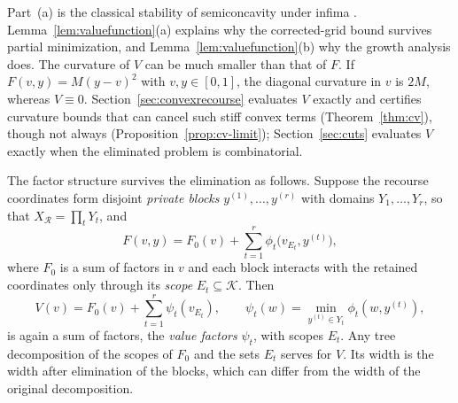 Part~(a) is the classical stability of semiconcavity under infima
\cite{CannarsaSinestrari2004}. Lemma~\ref{lem:valuefunction}(a) explains why
the corrected-grid bound survives partial minimization, and
Lemma~\ref{lem:valuefunction}(b) why the growth analysis does. The curvature
of $V$ can be much smaller than that of $F$. If $F(v,y)=M(y-v)^2$ with
$v,y\in[0,1]$, the diagonal curvature in $v$ is $2M$, whereas $V\equiv0$.
Section~\ref{sec:convexrecourse} evaluates $V$ exactly and certifies
curvature bounds that can cancel such stiff convex terms
(Theorem~\ref{thm:cv}), though not always (Proposition~\ref{prop:cv-limit});
Section~\ref{sec:cuts} evaluates $V$ exactly when the eliminated problem is
combinatorial.

The factor structure survives the elimination as follows. Suppose the
recourse coordinates form disjoint \emph{private blocks}
$y^{(1)},\dots,y^{(r)}$ with domains $Y_1,\dots,Y_r$, so that
$X_{\mathcal R}=\prod_tY_t$, and
\begin{equation}\label{eq:privateblocks}
F(v,y)=F_0(v)+\sum_{t=1}^r\phi_t\bigl(v_{E_t},y^{(t)}\bigr),
\end{equation}
where $F_0$ is a sum of factors in $v$ and each block interacts with the
retained coordinates only through its \emph{scope} $E_t\subseteq\mathcal K$.
Then
\[
V(v)=F_0(v)+\sum_{t=1}^r\psi_t(v_{E_t}),\qquad
\psi_t(w)=\min_{y^{(t)}\in Y_t}\phi_t(w,y^{(t)}),
\]
is again a sum of factors, the \emph{value factors} $\psi_t$, with scopes
$E_t$. Any tree decomposition of the scopes of $F_0$ and the sets $E_t$
serves for $V$. Its width is the width after elimination of the blocks,
which can differ from the width of the original decomposition.


